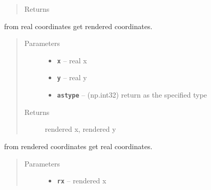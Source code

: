 \documentclass[letterpaper,10pt,english]{sphinxmanual}
\begin{document}
\begin{fulllineitems}
\begin{fulllineitems}
\begin{quote}
\begin{description}
\item[{Returns}] \leavevmode


\end{description}\end{quote}

\end{fulllineitems}


\begin{fulllineitems}
\label{RRtoolbox.lib:RRtoolbox.lib.plotter.Plotim.real2render}
from real coordinates get rendered coordinates.
\begin{quote}\begin{description}
\item[{Parameters}] \leavevmode\begin{itemize}
\item {} 
\textbf{\texttt{x}} -- real x

\item {} 
\textbf{\texttt{y}} -- real y

\item {} 
\textbf{\texttt{astype}} -- (np.int32) return as the specified type

\end{itemize}

\item[{Returns}] \leavevmode
rendered x, rendered y

\end{description}\end{quote}

\end{fulllineitems}


\begin{fulllineitems}
\label{RRtoolbox.lib:RRtoolbox.lib.plotter.Plotim.render2real}
from rendered coordinates get real coordinates.
\begin{quote}\begin{description}
\item[{Parameters}] \leavevmode\begin{itemize}
\item {} 
\textbf{\texttt{rx}} -- rendered x


\end{itemize}
\end{description}
\end{quote}
\end{fulllineitems}
\end{fulllineitems}
\end{document}
